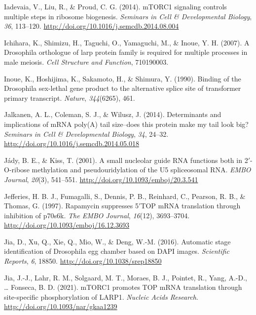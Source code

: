 \documentclass[12pt,twoside]{reedthesis}
\newlength{\cslhangindent}
\newenvironment{cslreferences}%
  {\setlength{\parindent}{0pt}%
  \everypar{\setlength{\hangindent}{\cslhangindent}}\ignorespaces}%
  {\par}
\begin{document}
\begin{cslreferences}
\leavevmode\hypertarget{ref-iadevaiaMTORC1SignalingControls2014}{}%
Iadevaia, V., Liu, R., \& Proud, C. G. (2014). mTORC1 signaling controls multiple steps in ribosome biogenesis. \emph{Seminars in Cell \& Developmental Biology}, \emph{36}, 113--120. \url{http://doi.org/10.1016/j.semcdb.2014.08.004}

\leavevmode\hypertarget{ref-Ichihara2007a}{}%
Ichihara, K., Shimizu, H., Taguchi, O., Yamaguchi, M., \& Inoue, Y. H. (2007). A Drosophila orthologue of larp protein family is required for multiple processes in male meiosis. \emph{Cell Structure and Function}, 710190003.

\leavevmode\hypertarget{ref-Inoue1990}{}%
Inoue, K., Hoshijima, K., Sakamoto, H., \& Shimura, Y. (1990). Binding of the Drosophila sex-lethal gene product to the alternative splice site of transformer primary transcript. \emph{Nature}, \emph{344}(6265), 461.

\leavevmode\hypertarget{ref-Jalkanen2014h}{}%
Jalkanen, A. L., Coleman, S. J., \& Wilusz, J. (2014). Determinants and implications of mRNA poly(A) tail size--does this protein make my tail look big? \emph{Seminars in Cell \& Developmental Biology}, \emph{34}, 24--32. \url{http://doi.org/10.1016/j.semcdb.2014.05.018}

\leavevmode\hypertarget{ref-Jady2001c}{}%
Jády, B. E., \& Kiss, T. (2001). A small nucleolar guide RNA functions both in 2\({'}\)-O-ribose methylation and pseudouridylation of the U5 spliceosomal RNA. \emph{EMBO Journal}, \emph{20}(3), 541--551. \url{http://doi.org/10.1093/emboj/20.3.541}

\leavevmode\hypertarget{ref-jefferiesRapamycinSuppressesTOP1997}{}%
Jefferies, H. B. J., Fumagalli, S., Dennis, P. B., Reinhard, C., Pearson, R. B., \& Thomas, G. (1997). Rapamycin suppresses 5\({'}\)TOP mRNA translation through inhibition of p70s6k. \emph{The EMBO Journal}, \emph{16}(12), 3693--3704. \url{http://doi.org/10.1093/emboj/16.12.3693}

\leavevmode\hypertarget{ref-Jia2016b}{}%
Jia, D., Xu, Q., Xie, Q., Mio, W., \& Deng, W.-M. (2016). Automatic stage identification of Drosophila egg chamber based on DAPI images. \emph{Scientific Reports}, \emph{6}, 18850. \url{http://doi.org/10.1038/srep18850}

\leavevmode\hypertarget{ref-jiaMTORC1PromotesTOP2021}{}%
Jia, J.-J., Lahr, R. M., Solgaard, M. T., Moraes, B. J., Pointet, R., Yang, A.-D., \ldots{} Fonseca, B. D. (2021). mTORC1 promotes TOP mRNA translation through site-specific phosphorylation of LARP1. \emph{Nucleic Acids Research}. \url{http://doi.org/10.1093/nar/gkaa1239}


\end{cslreferences}
\end{document}

